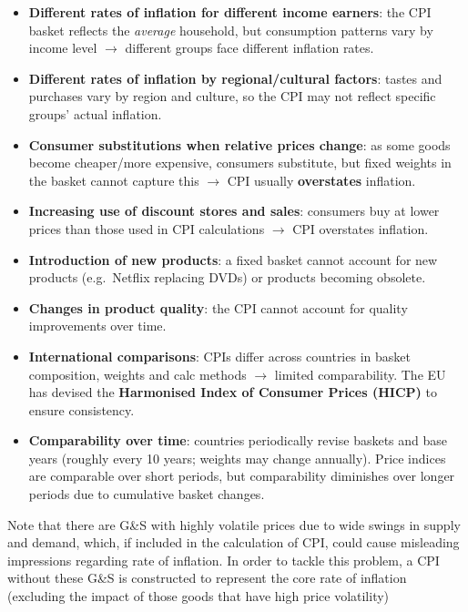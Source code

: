 \begin{itemize}
  \item \textbf{Different rates of inflation for different income earners}: the CPI basket reflects the \textit{average} household, but consumption patterns vary by income level $\to$ different groups face different inflation rates.
  \item \textbf{Different rates of inflation by regional/cultural factors}: tastes and purchases vary by region and culture, so the CPI may not reflect specific groups' actual inflation.
  \item \textbf{Consumer substitutions when relative prices change}: as some goods become cheaper/more expensive, consumers substitute, but fixed weights in the basket cannot capture this $\to$ CPI usually \textbf{overstates} inflation.
  \item \textbf{Increasing use of discount stores and sales}: consumers buy at lower prices than those used in CPI calculations $\to$ CPI overstates inflation.
  \item \textbf{Introduction of new products}: a fixed basket cannot account for new products (e.g.\ Netflix replacing DVDs) or products becoming obsolete.
  \item \textbf{Changes in product quality}: the CPI cannot account for quality improvements over time.
  \item \textbf{International comparisons}: CPIs differ across countries in basket composition, weights and calc methods $\to$ limited comparability. The EU has devised the \textbf{Harmonised Index of Consumer Prices (HICP)} to ensure consistency.
  \item \textbf{Comparability over time}: countries periodically revise baskets and base years (roughly every 10 years; weights may change annually). Price indices are comparable over short periods, but comparability diminishes over longer periods due to cumulative basket changes.
\end{itemize}
Note that there are G\&S with highly volatile prices due to wide swings in supply and demand, which, if included in the calculation of CPI, could cause misleading impressions regarding rate of inflation. In order to tackle this problem, a CPI without these G\&S is constructed to represent the core rate of inflation (excluding the impact of those goods that have high price volatility)\\\\
